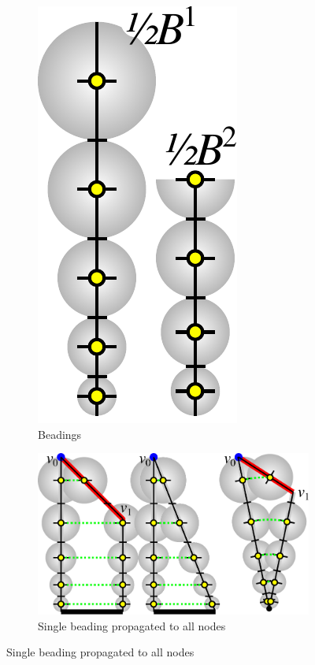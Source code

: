\begin{figure}
\centering
\setlength{\figheight}{.29\columnwidth}
\begin{subfigure}{0.14\columnwidth}\centering
\includegraphics[height=\figheight]{sources/method/trapezoid_beading_beading.pdf}
\caption{Beadings}\label{trapezoid_beading_beading}
\end{subfigure}
\begin{subfigure}{0.5\columnwidth}\centering
\includegraphics[height=\figheight]{sources/method/trapezoid_beading_propagated.pdf}
\caption{Single beading propagated to all nodes}\label{trapezoid_beading_propagated}

\end{subfigure}
\end{figure}
